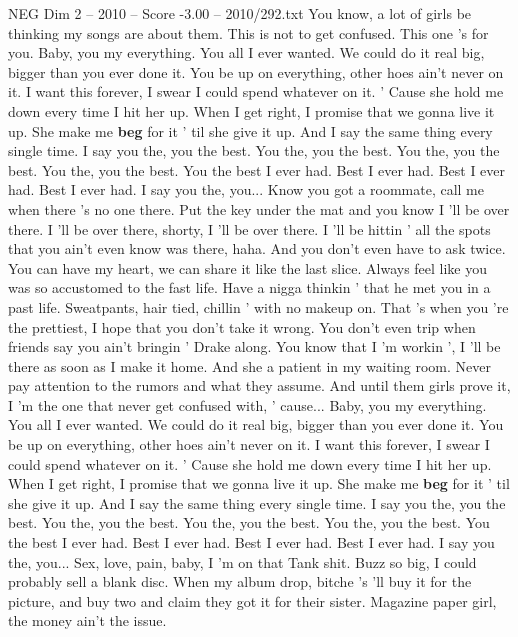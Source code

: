 \begin{textsample}{NEG Dim 2 – 2010 – Score -3.00 – 2010/292.txt}  \label{ex:f2_neg_007}
You know, a lot of girls be thinking my songs are about them.
This is not to get confused.
This one 's for you.
Baby, you my everything.
You all I ever wanted.
We could do it real big, bigger than you ever done it.
You be up on everything, other hoes ain't never on it.
I want this forever, I swear I could spend whatever on it. ' Cause she hold me down every time I hit her up.
When I get right, I promise that we gonna live it up.
She make me \textbf{beg} for it ' til she give it up.
And I say the same thing every single time.
I say you the, you the best.
You the, you the best.
You the, you the best.
You the, you the best.
You the best I ever had.
Best I ever had.
Best I ever had.
Best I ever had.
I say you the, you...
Know you got a roommate, call me when there 's no one there.
Put the key under the mat and you know I 'll be over there.
I 'll be over there, shorty, I 'll be over there.
I 'll be hittin ' all the spots that you ain't even know was there, haha.
And you don't even have to ask twice.
You can have my heart, we can share it like the last slice.
Always feel like you was so accustomed to the fast life.
Have a nigga thinkin ' that he met you in a past life.
Sweatpants, hair tied, chillin ' with no makeup on.
That 's when you 're the prettiest, I hope that you don't take it wrong.
You don't even trip when friends say you ain't bringin ' Drake along.
You know that I 'm workin ', I 'll be there as soon as I make it home.
And she a patient in my waiting room.
Never pay attention to the rumors and what they assume.
And until them girls prove it, I 'm the one that never get confused with, ' cause...
Baby, you my everything.
You all I ever wanted.
We could do it real big, bigger than you ever done it.
You be up on everything, other hoes ain't never on it.
I want this forever, I swear I could spend whatever on it. ' Cause she hold me down every time I hit her up.
When I get right, I promise that we gonna live it up.
She make me \textbf{beg} for it ' til she give it up.
And I say the same thing every single time.
I say you the, you the best.
You the, you the best.
You the, you the best.
You the, you the best.
You the best I ever had.
Best I ever had.
Best I ever had.
Best I ever had.
I say you the, you...
Sex, love, pain, baby, I 'm on that Tank shit.
Buzz so big, I could probably sell a blank disc.
When my album drop, bitche 's 'll buy it for the picture, and buy two and claim they got it for their sister.
Magazine paper girl, the money ain't the issue.

\end{textsample}
